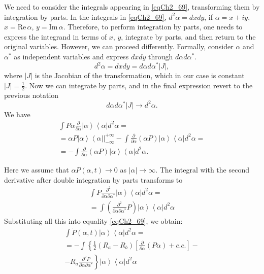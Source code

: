 We need to consider the integrals appearing in \eqref{eqCh2_69},
transforming them by integration by parts.
In the integrals in \eqref{eqCh2_69}, $d^2\alpha = dx dy$, if
$\alpha = x + i y$, $x = \mathrm{Re}\,\alpha$, $y = \mathrm{Im}\,\alpha$.
Therefore, to perform integration by parts, one needs to express the
integrand in terms of $x$, $y$, integrate by parts,
and then return to the original variables. However, we can proceed differently.
Formally, consider $\alpha$ and $\alpha^{*}$ as independent
variables and express $dx dy$ through $d\alpha d\alpha^{*}$.
\[
d^2\alpha = dx dy = d\alpha d\alpha^{*} \left|J\right|,
\]
where $\left|J\right|$ is the Jacobian of the transformation, which in our case is
constant $\left|J\right| = \frac{1}{2}$. Now we can
integrate by parts, and in the final expression revert to
the previous notation 
\[
d\alpha d\alpha^{*} \left|J\right| \rightarrow d^2\alpha.
\]
We have  
\begin{eqnarray}
\int P \alpha \frac{\partial}{\partial \alpha}
\left|\alpha\right>\left<\alpha\right| 
d^2 \alpha = 
\nonumber \\
= \left.\alpha P \left|\alpha\right>\left<\alpha\right|
\right|_{-\infty}^{+\infty} - 
\int \frac{\partial}{\partial \alpha}\left(\alpha P\right)
\left|\alpha\right>\left<\alpha\right|d^2 \alpha = 
\nonumber \\
= 
- \int \frac{\partial}{\partial \alpha}\left(\alpha P\right)
\left|\alpha\right>\left<\alpha\right|d^2 \alpha.
\label{eqCh2_70}
\end{eqnarray}

Here we assume that $\alpha P\left(\alpha, t\right) \rightarrow
0$ as $\left|\alpha\right| \rightarrow \infty$. The integral with the second
derivative after double integration by parts transforms to  
\begin{eqnarray}
\int P \frac{\partial^2}{\partial \alpha \partial \alpha^{*}}
\left|\alpha\right>\left<\alpha\right| 
d^2 \alpha = 
\nonumber \\
= \int \left(\frac{\partial^2}{\partial \alpha \partial \alpha^{*}}
P\right) \left|\alpha\right>\left<\alpha\right|  
d^2 \alpha
\label{eqCh2_71}
\end{eqnarray}
Substituting all this into equality \eqref{eqCh2_69}, we obtain:
\begin{eqnarray}
\int \dot{P} \left(\alpha, t\right) 
\left|\alpha\right>\left<\alpha\right| 
d^2 \alpha = 
\nonumber \\
= - \int \left\{
\frac{1}{2}\left(R_a - R_b\right)
\left[
\frac{\partial}{\partial \alpha}
\left(P \alpha\right) + c.c.
\right]
\right.
-
\nonumber \\
- \left.
R_a \frac{\partial^2 P}{\partial \alpha \partial \alpha^{*}}
\right\}
\left|\alpha\right>\left<\alpha\right| 
d^2 \alpha
\label{eqCh2_72}
\end{eqnarray}

